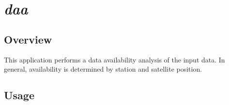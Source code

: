 %
%

\section{\emph{daa}}
\subsection{Overview}
This application performs a data availability analysis of the input data. In general, availability is determined by station and satellite position.

\subsection{Usage}
